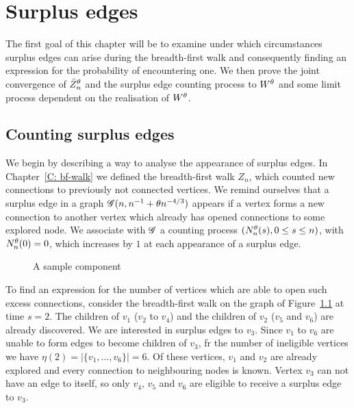 
\chapter{Surplus edges} \label{C: surplus edges}

The first goal of this chapter will be to examine under which circumstances surplus edges can arise during the breadth-first walk 
and consequently finding an expression for the probability of encountering one.
We then prove the joint convergence of $\bar{Z}^{\theta}_n$ and the surplus edge counting process to $W^{\theta}$ and some limit process dependent on the realisation of $W^{\theta}$.


\section{Counting surplus edges}

We begin by describing a way to analyse the appearance of surplus edges.
In Chapter~\ref{C: bf-walk} we defined the breadth-first walk $Z_n$, 
which counted new connections to previously not connected vertices.
We remind ourselves that a surplus edge in a graph $\mathscr{G}(n, n^{-1} + \theta n^{-4/3})$ appears if
a vertex forms a new connection to another vertex
which already has opened connections to some explored node.
We associate with $\mathscr{G}$ a counting process $(N_n^{\theta}(s), 0 \leq s \leq n)$, \label{I: nnt}
with $N_n^{\theta}(0) = 0$, which increases by $1$ at each appearance of a surplus edge.

\begin{figure}[h]
	\centering
	\scalebox{0.85}{
		
	}
	\caption{A sample component} 
	\label{F: Surplus Edges Tree}
\end{figure}

To find an expression for the number of vertices which are able to open such excess connections, 
consider the breadth-first walk on the graph of Figure~\ref{F: Surplus Edges Tree} at time $s=2$.
The children of $v_1$ ($v_2$ to $v_4$) and the children of $v_2$ ($v_5$ and $v_6$) are already discovered.
We are interested in surplus edges to $v_3$.
Since $v_1$ to $v_6$ are unable to form edges to become children of $v_3$, 
fr the number of ineligible vertices
we have $\eta(2) = |\{ v_1, \dots,  v_6\}| = 6$.
Of these vertices, $v_1$ and $v_2$ are already explored and every connection to neighbouring nodes is known.
Vertex $v_3$ can not have an edge to itself, so only $v_4$, $v_5$ and $v_6$ are eligible to receive a surplus edge to $v_3$.

